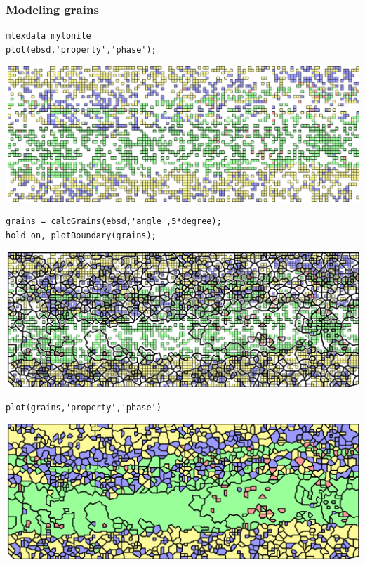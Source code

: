 \begin{frame}[fragile]
  \frametitle{Modeling grains}


\begin{overprint}


\begin{lstlisting}
mtexdata mylonite
plot(ebsd,'property','phase');
\end{lstlisting}

\begin{center}
\includegraphics[width=\linewidth]{fig/twinsa}
\par\end{center}


\begin{lstlisting}
grains = calcGrains(ebsd,'angle',5*degree);
hold on, plotBoundary(grains);
\end{lstlisting}

\begin{center}
\includegraphics[width=\linewidth]{fig/twinsb}
\par\end{center}



\begin{lstlisting}
plot(grains,'property','phase')
\end{lstlisting}

\begin{center}
\includegraphics[width=\linewidth]{fig/twinsd}
\par\end{center}



\end{overprint}
\end{frame}
